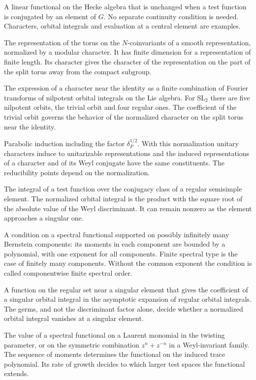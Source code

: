 \documentclass[12pt,letterpaper]{amsart}
\numberwithin{equation}{section}
\theoremstyle{definition}
\theoremstyle{remark}
\begin{document}
\begin{description}[style=nextline,leftmargin=1em]
\item[Invariant distribution] A linear functional on the Hecke algebra that is unchanged when a test function is conjugated by an element of $G$. No separate continuity condition is needed. Characters, orbital integrals and evaluation at a central element are examples.
\item[Jacquet module] The representation of the torus on the $N$-coinvariants of a smooth representation, normalized by a modular character. It has finite dimension for a representation of finite length. Its character gives the character of the representation on the part of the split torus away from the compact subgroup.
\item[Local character expansion] The expression of a character near the identity as a finite combination of Fourier transforms of nilpotent orbital integrals on the Lie algebra. For $\mathrm{SL}_2$ there are five nilpotent orbits, the trivial orbit and four regular ones. The coefficient of the trivial orbit governs the behavior of the normalized character on the split torus near the identity.
\item[Normalized induction] Parabolic induction including the factor $\delta_P^{1/2}$. With this normalization unitary characters induce to unitarizable representations and the induced representations of a character and of its Weyl conjugate have the same constituents. The reducibility points depend on the normalization.
\item[Orbital integral] The integral of a test function over the conjugacy class of a regular semisimple element. The normalized orbital integral is the product with the square root of the absolute value of the Weyl discriminant. It can remain nonzero as the element approaches a singular one.
\item[Quasi-finite spectral type] A condition on a spectral functional supported on possibly infinitely many Bernstein components: its moments in each component are bounded by a polynomial, with one exponent for all components. Finite spectral type is the case of finitely many components. Without the common exponent the condition is called componentwise finite spectral order.
\item[Shalika germ] A function on the regular set near a singular element that gives the coefficient of a singular orbital integral in the asymptotic expansion of regular orbital integrals. The germs, and not the discriminant factor alone, decide whether a normalized orbital integral vanishes at a singular element.
\item[Spectral moment] The value of a spectral functional on a Laurent monomial in the twisting parameter, or on the symmetric combination $z^n+z^{-n}$ in a Weyl-invariant family. The sequence of moments determines the functional on the induced trace polynomial. Its rate of growth decides to which larger test spaces the functional extends.

\end{description}
\end{document}

